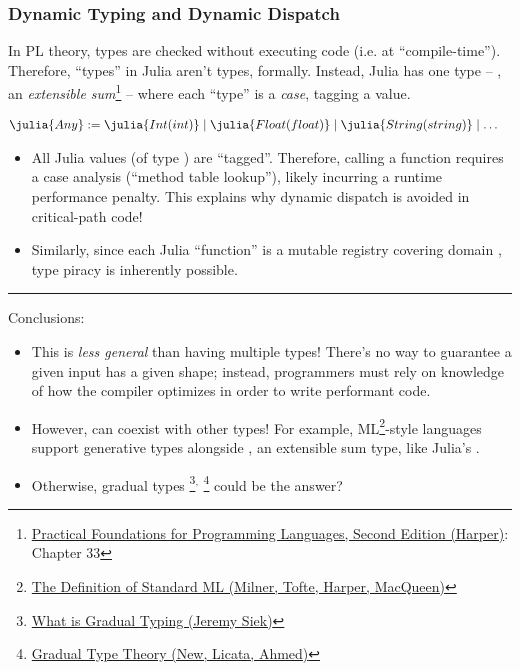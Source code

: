 \documentclass[8pt]{beamer}
\begin{document}
\begin{frame}
  \frametitle{Dynamic Typing and Dynamic Dispatch}

  In PL theory, types are checked without executing code (i.e. at ``compile-time''). Therefore, ``types'' in Julia aren't types, formally. Instead, Julia has one type -- , an \emph{extensible sum}\footnote{\href{http://www.cs.cmu.edu/~rwh/pfpl/}{Practical Foundations for Programming Languages, Second Edition (Harper)}: Chapter 33} -- where each ``type'' is a \emph{case}, tagging a value.

  \begin{align*}
    &\julia{Any} := \julia{Int(int)} \mid \julia{Float(float)} \mid \julia{String(string)} \mid \dots
  \end{align*}

  \begin{itemize}
    \item All Julia values (of type ) are ``tagged''. Therefore, calling a function requires a case analysis (``method table lookup''), likely incurring a runtime performance penalty. This explains why dynamic dispatch is avoided in critical-path code!
    \item Similarly, since each Julia ``function'' is a mutable registry covering domain , type piracy is inherently possible.
  \end{itemize}

  \noindent\rule{\linewidth}{0.4pt}

  Conclusions:
  \begin{itemize}
    \item This is \emph{less general} than having multiple types! There's no way to guarantee a given input has a given shape; instead, programmers must rely on knowledge of how the compiler optimizes in order to write performant code.
    \item However,  can coexist with other types! For example, ML\footnote{\href{https://smlfamily.github.io/sml97-defn.pdf}{The Definition of Standard ML (Milner, Tofte, Harper, MacQueen)}}-style languages support generative types alongside , an extensible sum type, like Julia's .
    \item Otherwise, gradual types%
    \footnote{\href{https://wphomes.soic.indiana.edu/jsiek/what-is-gradual-typing/}{What is Gradual Typing (Jeremy Siek)}}$^,$%
    \footnote{\href{http://www.ccs.neu.edu/home/amal/papers/gtt.pdf}{Gradual Type Theory (New, Licata, Ahmed)}}
    could be the answer?
  \end{itemize}
\end{frame}
\end{document}
